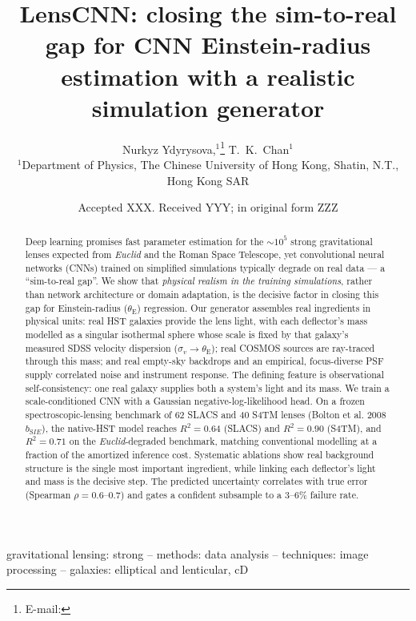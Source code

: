 \documentclass[fleqn,usenatbib]{mnras}
\title[Closing the sim-to-real gap for CNN $\thetaE$]{LensCNN: closing the
sim-to-real gap for CNN Einstein-radius estimation with a realistic
simulation generator}
\author[N. Ydyrysova et al.]{
Nurkyz Ydyrysova,$^{1}$\thanks{E-mail: \todo{email}}
T.~K.~Chan$^{1}$
\\
$^{1}$Department of Physics, The Chinese University of Hong Kong, Shatin, N.T., Hong Kong SAR
}
\date{Accepted XXX. Received YYY; in original form ZZZ}
\newcommand{\thetaE}{\theta_{\mathrm{E}}}
\newcommand{\sigmav}{\sigma_{v}}
\newcommand{\bsie}{b_{\mathrm SIE}}
\begin{document}
\label{firstpage}
\pagerange{\pageref{firstpage}--\pageref{lastpage}}
\maketitle

\begin{abstract}
Deep learning promises fast parameter estimation for the ${\sim}10^{5}$ strong
gravitational lenses expected from \textit{Euclid} and the Roman Space
Telescope, yet convolutional neural networks (CNNs) trained on simplified
simulations typically degrade on real data --- a ``sim-to-real gap''. We show
that \emph{physical realism in the training simulations}, rather than network
architecture or domain adaptation, is the decisive factor in closing this gap
for Einstein-radius ($\thetaE$) regression. Our generator assembles real
ingredients in physical units: real HST galaxies provide the lens light, with
each deflector's mass modelled as a singular isothermal sphere whose scale is
fixed by that galaxy's measured SDSS velocity dispersion
($\sigmav\!\rightarrow\!\thetaE$); real COSMOS sources are ray-traced through
this mass; and real empty-sky backdrops and an empirical, focus-diverse PSF
supply correlated noise and instrument response. The defining feature is
observational self-consistency: one real galaxy supplies both a system's light
and its mass. We train a scale-conditioned CNN with a Gaussian
negative-log-likelihood head. On a frozen spectroscopic-lensing benchmark of
62 SLACS and 40 S4TM lenses (Bolton et al. 2008 $\bsie$), the native-HST model
reaches $R^{2}=0.64$ (SLACS) and $R^{2}=0.90$ (S4TM), and $R^{2}=0.71$ on the
\textit{Euclid}-degraded benchmark, matching conventional modelling at a
fraction of the amortized inference cost. Systematic ablations show real
background structure is the single most important ingredient, while linking
each deflector's light and mass is the decisive step. The predicted uncertainty
correlates with true error (Spearman $\rho=0.6$--$0.7$) and gates a confident
subsample to a $3$--$6\%$ failure rate.
\end{abstract}

\begin{keywords}
gravitational lensing: strong -- methods: data analysis --
techniques: image processing -- galaxies: elliptical and lenticular, cD
\end{keywords}
\end{document}
